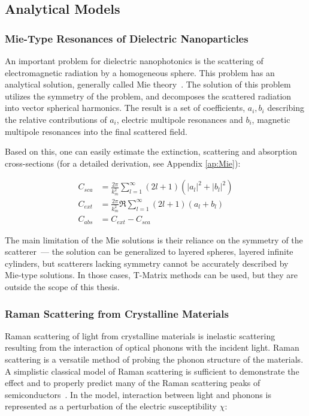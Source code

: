     \subsection{Analytical Models}
        \subsubsection{Mie-Type Resonances of Dielectric Nanoparticles}
                An important problem for dielectric nanophotonics is the scattering of electromagnetic radiation by
            a homogeneous sphere. This problem has an analytical solution, generally called Mie theory~\cite{mie1908beitrage}.
            The solution of this problem utilizes the symmetry of the problem, and decomposes the scattered radiation into
            vector spherical harmonics. The result is a set of coefficients, $a_i, b_i$ describing the relative contributions
            of $a_i$, electric multipole resonances and $b_i$, magnetic multipole resonances into the final scattered field.

                Based on this, one can easily estimate the extinction, scattering and absorption cross-sections (for a detailed
                derivation, see Appendix \ref{ap:Mie}):

            \begin{align}
                C_{sca} &= \frac{2\pi}{k^2_m}\sum_{l=1}^\infty (2l +1)(|a_l|^2 + |b_l|^2)\\
                C_{ext} &= \frac{2\pi}{k^2_m}\Re\sum_{l=1}^\infty (2l +1)(a_l + b_l)\\
                C_{abs} &= C_{ext} - C_{sca}
            \end{align}

                The main limitation of the Mie solutions is their reliance on the symmetry of the scatterer~--- the solution can
            be generalized to layered spheres, layered  infinite cylinders, but scatterers lacking symmetry cannot be accurately described
            by Mie-type solutions. In those cases, T-Matrix methods can be used, but they are outside the scope of this thesis.

        \subsubsection{Raman Scattering from Crystalline Materials}
                Raman scattering of light from crystalline materials is inelastic scattering resulting from the interaction of optical phonons with
            the incident light. Raman scattering is a versatile method of probing the phonon structure of the materials.
            A simplistic classical model of Raman scattering is sufficient to demonstrate the effect and to properly predict many of the
            Raman scattering peaks of semiconductors~\cite{peter2010fundamentals}. In the model, interaction between light and phonons
            is represented as a perturbation of the electric susceptibility $\chi$:

